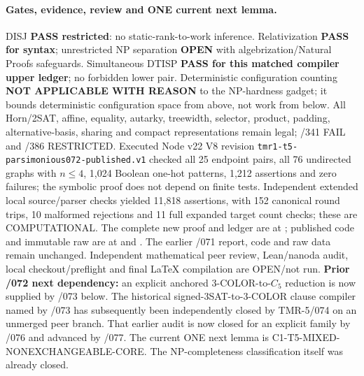 \documentclass[11pt]{article}
\begin{document}
\paragraph{Gates, evidence, review and ONE current next lemma.}
DISJ \textbf{PASS restricted}: no static-rank-to-work inference.
Relativization \textbf{PASS for syntax}; unrestricted NP separation
\textbf{OPEN} with algebrization/Natural Proofs safeguards.
Simultaneous DTISP \textbf{PASS for this matched compiler upper ledger};
no forbidden lower pair.
Deterministic configuration counting \textbf{NOT APPLICABLE WITH
REASON} to the NP-hardness gadget; it bounds deterministic
configuration space from above, not work from below.
All Horn/2SAT, affine, equality, autarky, treewidth, selector,
product, padding, alternative-basis, sharing and compact
representations remain legal; /341 FAIL and /386 RESTRICTED.
Executed Node v22 V8 revision \texttt{tmr1-t5-parsimonious072-published.v1}
checked all 25 endpoint pairs, all 76 undirected graphs with
$n\le4$, 1,024 Boolean one-hot patterns, 1,212 assertions and
zero failures; the symbolic proof does not depend on finite tests.
Independent extended local source/parser checks yielded 11,818
assertions, with 152 canonical round trips, 10 malformed rejections
and 11 full expanded target count checks; these are COMPUTATIONAL.
The complete new proof and ledger are at
;
published code and immutable raw are at
 and
.
The earlier /071 report, code and raw data remain unchanged.
Independent mathematical peer review, Lean/nanoda audit, local
checkout/preflight and final LaTeX compilation are OPEN/not run.
\textbf{Prior /072 next dependency:} an explicit anchored
3-COLOR-to-$C_5$ reduction is now supplied by /073 below.
The historical signed-3SAT-to-3-COLOR clause compiler named by
/073 has subsequently been independently closed by TMR-5/074
on an unmerged peer branch. That earlier audit is now closed
for an explicit family by /076 and advanced by /077. The
current ONE next lemma is C1-T5-MIXED-NONEXCHANGEABLE-CORE.
The NP-completeness classification itself was already closed.
\end{document}
